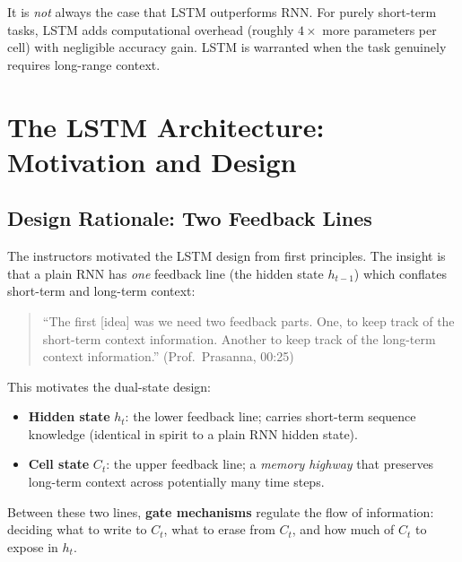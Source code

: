 \documentclass[12pt,a4paper]{article}
\begin{document}
\begin{keyinsight}[title=Task-Dependent Architecture Choice]
  It is \emph{not} always the case that LSTM outperforms RNN. For
  purely short-term tasks, LSTM adds computational overhead (roughly
  $4\times$ more parameters per cell) with negligible accuracy gain.
  LSTM is warranted when the task genuinely requires long-range context.
\end{keyinsight}

\section{The LSTM Architecture: Motivation and Design}
\label{sec:lstm-design}

\subsection{Design Rationale: Two Feedback Lines}
\label{subsec:two-lines}

The instructors motivated the LSTM design from first principles. The
insight is that a plain RNN has \emph{one} feedback line (the hidden state
$h_{t-1}$) which conflates short-term and long-term context:

\begin{quote}
``The first [idea] was we need two feedback parts. One, to keep track of the
short-term context information. Another to keep track of the long-term
context information.'' \hfill (Prof.\ Prasanna, 00:25)
\end{quote}

This motivates the dual-state design:

\begin{itemize}
  \item \textbf{Hidden state} $h_t$: the lower feedback line; carries
        short-term sequence knowledge (identical in spirit to a plain RNN
        hidden state).
  \item \textbf{Cell state} $C_t$: the upper feedback line; a
        \emph{memory highway} that preserves long-term context across
        potentially many time steps.
\end{itemize}

Between these two lines, \textbf{gate mechanisms} regulate the flow of
information: deciding what to write to $C_t$, what to erase from $C_t$,
and how much of $C_t$ to expose in $h_t$.
\end{document}
